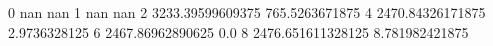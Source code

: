 0 nan nan
1 nan nan
2 3233.39599609375 765.5263671875
4 2470.84326171875 2.9736328125
6 2467.86962890625 0.0
8 2476.651611328125 8.781982421875
